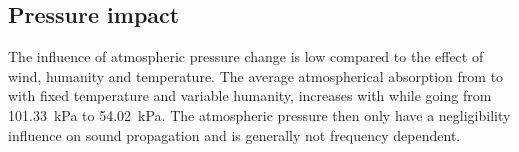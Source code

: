 %
%
%
%
%
%
%


\subsection{Pressure impact}\label{sub:sec:pre_imp}
The influence of atmospheric pressure change is low compared to the effect of wind, humanity and temperature. The average atmospherical absorption from  to  with fixed temperature and variable humanity, increases with  while going from \SI{101.33}{\kilo\pascal} to \SI{54.02}{\kilo\pascal}. The atmospheric pressure then only have a negligibility influence on sound propagation and is generally not frequency dependent. 

